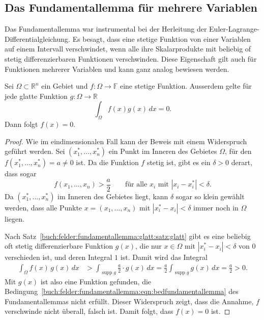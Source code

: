 %
%
%

%
%
\subsection{Das Fundamentallemma für mehrere Variablen}
Das Fundamentallemma war instrumental bei der Herleitung der
Euler-Lagrange-Dif\-fe\-ren\-tial\-glei\-chung.
Es besagt, dass eine stetige Funktion von einer Variablen auf einem Intervall
verschwindet, wenn alle ihre Skalarprodukte mit beliebig of stetig
differenzierbaren Funktionen verschwinden.
Diese Eigenschaft gilt auch für Funktionen mehrerer Variablen und kann
ganz analog bewiesen werden.

\begin{satz}[Fundamentallemma]
\label{buch:felder:fundamentallemma:satz:fundamentallemma}
Sei $\Omega\subset\mathbb{R}^n$ ein Gebiet und $f\colon \Omega\to\mathbb{F}$
eine stetige Funktion.
Ausserdem gelte für jede glatte Funktion $g\colon\Omega\to\mathbb{R}$ 
\begin{equation}
\int_{\Omega} f(x)g(x)\,dx = 0.
\label{buch:felder:fundamentallemma:eqn:bedfundamentallemma}
\end{equation}
Dann folgt $f(x)=0$.
\end{satz}

\begin{proof}
Wie im eindimensionalen Fall kann der Beweis mit einem Widerspruch
geführt werden.
Sei $(x^*_1,\dots,x^*_n)$ ein Punkt im Inneren des Gebietes $\Omega$,
für den $f(x^*_1,\dots,x^*_n)=a\ne 0$ ist.
Da die Funktion $f$ stetig ist, gibt es ein $\delta>0$ derart,
dass sogar
\[
f(x_1,\dots,x_n) > \frac{a}2
\qquad\text{für alle $x_i$ mit $|x_i-x^*_i|<\delta$.}
\]
Da $(x^*_1,\dots,x^*_n)$ im Inneren des Gebietes liegt, kann 
$\delta$ sogar so klein gewählt werden, dass alle Punkte
$x=(x_1,\dots,x_n)$ mit $|x^*_i-x_i|<\delta$ immer noch in
$\Omega$ liegen.

Nach Satz~\ref{buch:felder:fundamentallemma:glatt:satz:glatt}
gibt es eine beliebig oft stetig differenzierbare Funktion $g(x)$,
die nur $x\in\Omega$ mit $|x^*_i-x_i|<\delta$ von $0$ verschieden ist,
und deren Integral $1$ ist.
Damit wird das 
Integral
\begin{align*}
\int_{\Omega} f(x)\,g(x)\,dx
&>
\int_{\operatorname{supp}g}
\frac{a}2
\cdot
g(x)
\,dx
=
\frac{a}2
\int_{\operatorname{supp}g}
g(x)
\,dx
=
\frac{a}2>0.
\end{align*}
Mit $g(x)$ ist also eine Funktion gefunden, die
Bedingung~\eqref{buch:felder:fundamentallemma:eqn:bedfundamentallemma}
des Fundamentallemmas nicht erfüllt.
Dieser Widerspruch zeigt, dass die Annahme, $f$ verschwinde nicht überall,
falsch ist.
Damit folgt, dass $f(x)=0$ ist.
\end{proof}



